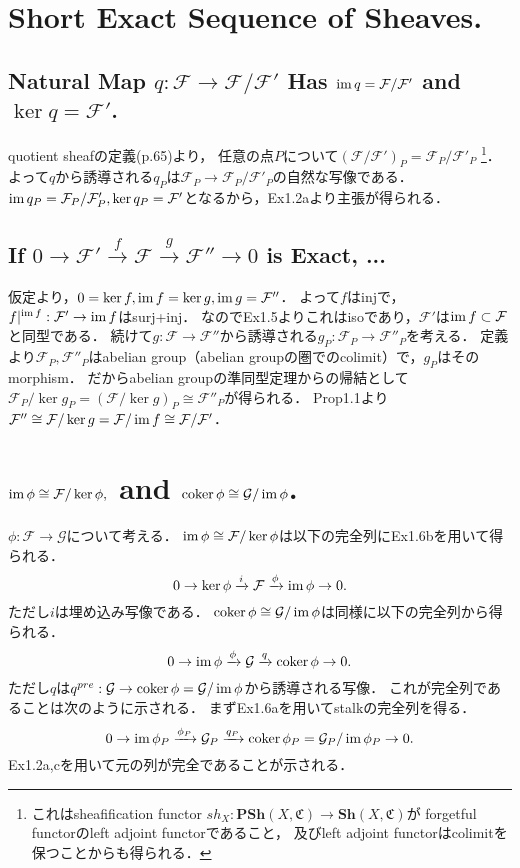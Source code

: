 \documentclass[a4paper]{jsarticle}
\newcommand{\shF}{\mathcal{F}}
\newcommand{\shG}{\mathcal{G}}
\begin{document}
\section{Short Exact Sequence of Sheaves.} %
    \subsection{Natural Map $q:\shF \to \shF/\shF'$ Has $\im q=\shF/\shF'$ and $\ker q=\shF'$.}
    quotient sheafの定義(p.65)より，
    任意の点$P$について$(\shF/\shF')_P=\shF_P/\shF'_P$
    \footnote
    {
        これはsheafification functor $sh_X: \mathbf{PSh}(X, \mathfrak{C}) \to \mathbf{Sh}(X, \mathfrak{C})$が
        forgetful functorのleft adjoint functorであること，
        及びleft adjoint functorはcolimitを保つことからも得られる．
    }．
    よって$q$から誘導される$q_P$は$\shF_P \to \shF_P/\shF'_P$の自然な写像である．
    $\im q_P=\shF_P/\shF'_P, \ker q_P=\shF'$となるから，Ex1.2aより主張が得られる．

    \subsection{If $0 \to \shF' \xrightarrow{f} \shF \xrightarrow{g} \shF'' \to 0$ is Exact, ...}
    仮定より，$0=\ker f, \im f=\ker g, \im g=\shF''$．
    よって$f$はinjで，$f|^{\im f}: \shF' \to \im f$はsurj+inj．
    なのでEx1.5よりこれはisoであり，$\shF'$は$\im f \subset \shF$と同型である．
    続けて$g:\shF \to \shF''$から誘導される$g_P: \shF_P \to \shF''_P$を考える．
    定義より$\shF_P, \shF''_P$はabelian group（abelian groupの圏でのcolimit）で，$g_P$はそのmorphism．
    だからabelian groupの準同型定理からの帰結として$\shF_P/\ker g_P=(\shF/\ker g)_P \cong \shF''_P$が得られる．
    Prop1.1より$\shF'' \cong \shF/\ker g=\shF/\im f \cong \shF/\shF'$．

\section{$\im \phi \cong \shF/\ker \phi,$ and $\coker \phi \cong \shG/\im \phi$.} %
    $\phi: \shF \to \shG$について考える．
    $\im \phi \cong \shF/\ker \phi$は以下の完全列にEx1.6bを用いて得られる．
    \[ 0 \to \ker \phi \xrightarrow{i} \shF \xrightarrow{\phi} \im \phi \to 0. \]
    ただし$i$は埋め込み写像である．
    $\coker \phi \cong \shG/\im \phi$は同様に以下の完全列から得られる．
    \[ 0 \to \im \phi \xrightarrow{\phi} \shG \xrightarrow{q} \coker \phi \to 0. \]
    ただし$q$は$q^{pre}: \shG \to \coker \phi=\shG/\im \phi$から誘導される写像．
    これが完全列であることは次のように示される．
    まずEx1.6aを用いてstalkの完全列を得る．
    \[ 0 \to \im \phi_P \xrightarrow{\phi_P} \shG_P \xrightarrow{q_P} \coker \phi_P=\shG_P/\im \phi_P \to 0. \]
    Ex1.2a,cを用いて元の列が完全であることが示される．
\end{document}
